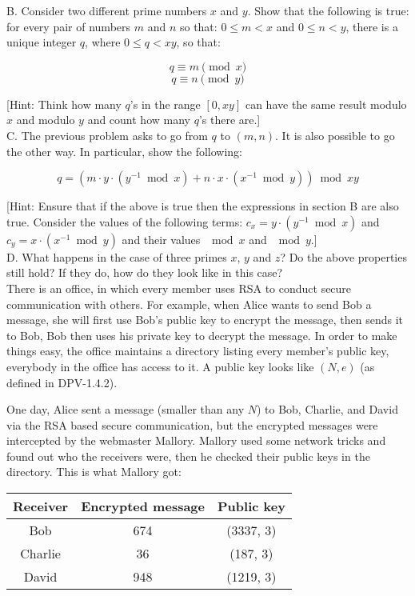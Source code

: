 \documentclass{article}
\begin{document}
\noindent B. Consider two different prime numbers $x$ and $y$. Show that the
following is true: for every pair of numbers $m$ and $n$ so that: $0
\leq m < x$ and $0 \leq n < y$, there is a unique integer $q$, where
$0 \leq q < xy$, so that:

$$q \equiv m \pmod{x}$$
$$q \equiv n \pmod{y}$$

[Hint: Think how many $q$'s in the range $[0,xy]$ can have the same
  result modulo $x$ and modulo $y$ and count how many $q$'s there
  are.]\\
  
\noindent C. The previous problem asks to go from $q$ to $(m,n)$. It is also
possible to go the other way. In particular, show the following:

$$q = ( m \cdot y \cdot (y^{-1} \bmod{x}) + n \cdot x \cdot
(x^{-1} \bmod{y}) ) \bmod{xy}$$

[Hint: Ensure that if the above is true then the expressions in section B are
  also true. Consider the values of the following terms: $c_x = y
  \cdot (y^{-1} \bmod{x})$ and $c_y = x \cdot (x^{-1} \bmod{y})$ and
their values $\mod{x}$ and $\mod{y}$.]\\

\noindent D. What happens in the case of three primes $x$, $y$ and $z$? Do the
above properties still hold? If they do, how do they look like in this
case?\\

 There is an office, in which every member
uses RSA to conduct secure communication with others.  For example,
when Alice wants to send Bob a message, she will first use Bob's
public key to encrypt the message, then sends it to Bob, Bob then uses
his private key to decrypt the message.  In order to make things easy,
the office maintains a directory listing every member's public key,
everybody in the office has access to it. A public key looks like $(N,
e)$ (as defined in DPV-1.4.2).

\noindent One day, Alice sent a message (smaller than any $N$) to Bob,
Charlie, and David via the RSA based secure communication, but the
encrypted messages were intercepted by the webmaster Mallory. Mallory
used some network tricks and found out who the receivers were, then he
checked their public keys in the directory. This is what Mallory got:

\begin{center}
  \begin{tabular}{ | c | c | c | }
    \hline
    Receiver & Encrypted message & Public key \\ \hline
    Bob & 674 & (3337, 3) \\
    Charlie & 36 & (187, 3) \\
    David & 948 & (1219, 3) \\
    \hline
  \end{tabular}
\end{center}
\end{document}
